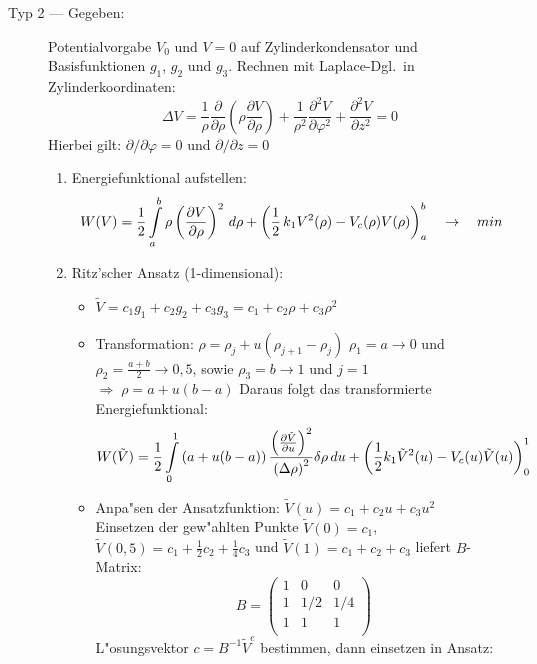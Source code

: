 \begin{description}
\item[Typ 2 --- Gegeben:] Potentialvorgabe $V_0$ und $V=0$ auf Zylinderkondensator
     und Basisfunktionen $g_1$, $g_2$ und $g_3$. Rechnen mit Laplace-Dgl.\ in
     Zylinderkoordinaten:
     $$\Delta V = \frac{1}{\rho} \frac{\partial}{\partial \rho}\left( \rho
     \frac{\partial V}{\partial\rho}\right) + \frac{1}{\rho^2}
     \frac{\partial^2V}{\partial \varphi^2} + \frac{\partial^2 V}{\partial z^2}
     = 0 $$ Hierbei gilt: $\partial / \partial \varphi =0$ und
     $\partial / \partial z =0$
   \begin{enumerate}
     \item Energiefunktional aufstellen:
           $$W(V)= \frac{1}{2} \int\limits_a^b \rho \left( \frac{\partial
           V}{\partial\rho}\right)^2\, d\rho + \left( \frac{1}{2} \, k_1
           V^2(\rho) - V_c (\rho)V(\rho)\right)_a^b \quad\rightarrow\quad min$$
     \item Ritz'scher  Ansatz (1-dimensional):
      \begin{itemize}
      \item $\tilde{V} = c_1g_1  + c_2g_2 + c_3g_3 = c_1 + c_2\rho + c_3\rho^2$
      \item Transformation: $\rho = \rho_j + u (\rho_{j+1} - \rho_j)$ $\rho_1=a
           \rightarrow 0$ und $\rho_2=\frac{a+b}{2} \rightarrow 0,5$, sowie
           $\rho_3=b \rightarrow 1$ und $j=1$\\
           $\Rightarrow \; \rho = a+u(b-a)$ Daraus folgt das transformierte
           Energiefunktional:
           $$W(\tilde{V}) = \frac{1}{2} \int\limits_0^1 \left( a + u(b-a)\right)
           \frac{\left(\frac{\partial \tilde{V}}{\partial
           u}\right)^2}{\left(\Delta\rho\right)^2} \delta \rho \, du + \left(
           \frac{1}{2} k_1 \tilde{V}^2(u) - V_c(u) \tilde{V} (u) \right)_0^1$$
      \item Anpa"sen der Ansatzfunktion: $\tilde{V}(u) = c_1 + c_2u + c_3u^2$\\
           Einsetzen der gew"ahlten Punkte $\tilde{V}(0)= c_1$, $\tilde{V}(0,5)=
           c_1 + \frac{1}{2} c_2 + \frac{1}{4}c_3$ und $\tilde{V}(1)= c_1 + c_2
           + c_3$ liefert $B$-Matrix:
           $$B=\left(\begin{array}{ccc}1&0&0\\1&1/2&1/4\\1&1&1\\
             \end{array}\right)$$
            L"osungsvektor $c=B^{-1}\tilde{V}^e$ bestimmen, dann einsetzen in
           Ansatz:

\end{itemize}
\end{enumerate}
\end{description}
